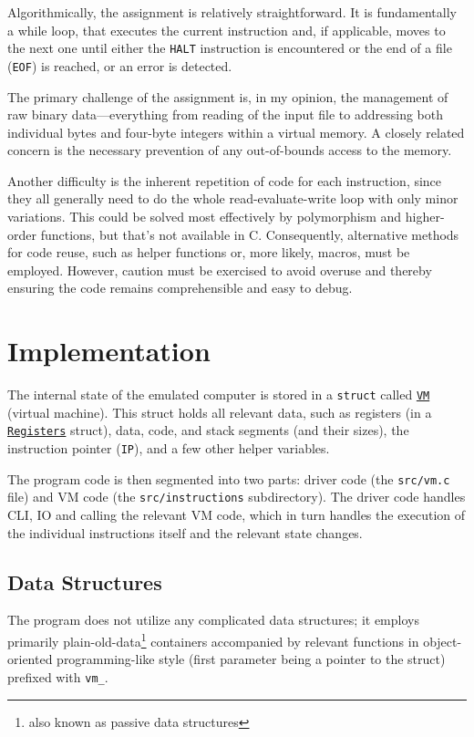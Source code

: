 \documentclass[10pt,a4paper,final]{article}
\newcommand{\code}[1]{\texttt{#1}}
\begin{document}
Algorithmically, the assignment is relatively straightforward. It is
fundamentally a while loop, that executes the current instruction and, if
applicable, moves to the next one until either the \code{HALT} instruction is
encountered or the end of a file (\code{EOF}) is reached, or an error is
detected.

The primary challenge of the assignment is, in my opinion, the management of raw
binary data---everything from reading of the input file to addressing both
individual bytes and four-byte integers within a virtual memory. A closely
related concern is the necessary prevention of any out-of-bounds access to the
memory.

Another difficulty is the inherent repetition of code for each instruction,
since they all generally need to do the whole read-evaluate-write loop with only
minor variations. This could be solved most effectively by polymorphism and
higher-order functions, but that's not available in C. Consequently, alternative
methods for code reuse, such as helper functions or, more likely, macros, must
be employed. However, caution must be exercised to avoid overuse and thereby
ensuring the code remains comprehensible and easy to debug.

\section{Implementation}
\label{sec:impl}

The internal state of the emulated computer is stored in a \code{struct} called
\hyperlink{vm}{\code{VM}} (virtual machine). This struct holds all relevant
data, such as registers (in a \hyperlink{registers}{\code{Registers}} struct),
data, code, and stack segments (and their sizes), the instruction pointer
(\code{IP}), and a few other helper variables.

The program code is then segmented into two parts: driver code (the
\code{src/vm.c} file) and VM code (the \code{src/instructions} subdirectory).
The driver code handles CLI, IO and calling the relevant VM code, which in turn
handles the execution of the individual instructions itself and the relevant
state changes. 

\subsection{Data Structures}

The program does not utilize any complicated data structures; it employs
primarily plain-old-data\footnote{also known as passive data structures}
containers accompanied by relevant functions in object-oriented programming-like
style (first parameter being a pointer to the struct) prefixed with \code{vm_}.
\end{document}
